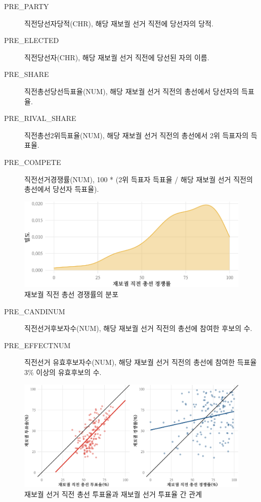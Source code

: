 \documentclass[
  11pt,
  letter]{article}
\begin{document}
\begin{description}
\item[PRE\_PARTY]
직전당선자당적(CHR), 해당 재보궐 선거 직전에 당선자의 당적.
\item[PRE\_ELECTED]
직전당선자(CHR), 해당 재보궐 선거 직전에 당선된 자의 이름.
\item[PRE\_SHARE]
직전총선당선득표율(NUM), 해당 재보궐 선거 직전의 총선에서 당선자의
득표율.
\item[PRE\_RIVAL\_SHARE]
직전총선2위득표율(NUM), 해당 재보궐 선거 직전의 총선에서 2위 득표자의
득표율.
\item[PRE\_COMPETE]
직전선거경쟁률(NUM), 100 * (2위 득표자 득표율 / 해당 재보궐 선거 직전의
총선에서 당선자 득표율).
\end{description}

\begin{figure}
\centering
\includegraphics{Codebook_national_files/figure-latex/unnamed-chunk-13-1.pdf}
\caption{재보궐 직전 총선 경쟁률의 분포}
\end{figure}

\begin{description}
\item[PRE\_CANDINUM]
직전선거후보자수(NUM), 해당 재보궐 선거 직전의 총선에 참여한 후보의 수.
\item[PRE\_EFFECTNUM]
직전선거 유효후보자수(NUM), 해당 재보궐 선거 직전의 총선에 참여한 득표율
3\% 이상의 유효후보의 수.
\end{description}

\begin{figure}
\centering
\includegraphics{Codebook_national_files/figure-latex/unnamed-chunk-14-1.pdf}
\caption{재보궐 선거 직전 총선 투표율과 재보궐 선거 투표율 간 관계}
\end{figure}
\end{document}
